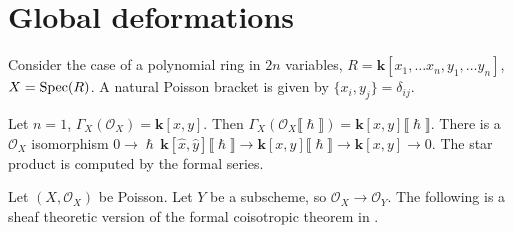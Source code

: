 
    \iffalse

    \section{Global deformations}
    
    Consider the case of a polynomial ring in \(2n\) variables, \(R = \mathbf{k}[x_1, \dots x_n, y_1, \dots y_n]\), \(X= \mathrm{Spec}(R)\). A natural Poisson bracket is given by \( \{x_i,y_j\} = \delta_{ij}\).
    \begin{ex}
    Let \(n=1\), \( \Gamma_X( \mathcal{O}_X) = \mathbf{k}[x,y]\). Then \(\Gamma_X (\mathcal{O}_X \lBrack \hslash \rBrack) = \mathbf{k}[x,y]\lBrack \hslash \rBrack \). There is a \(\mathcal{O}_X\) isomorphism  \(0 \rightarrow \hslash\, \mathbf{k}[\hat{x},\hat{y}]\lBrack \hslash \rBrack \rightarrow \mathbf{k}[x,y]\lBrack \hslash \rBrack  \rightarrow \mathbf{k}[x,y] \rightarrow 0\). The star product is computed by the formal series.
    \end{ex}
    

    Let \( (X,\mathcal{O}_X)\) be Poisson.
    Let \(Y\) be a subscheme, so \( \mathcal{O}_X \rightarrow \mathcal{O}_Y\). The following is a sheaf theoretic version of the formal coisotropic theorem in \cite{dasilva}.
    
    \begin{thm} 
 
    \end{thm}
    
    
   
